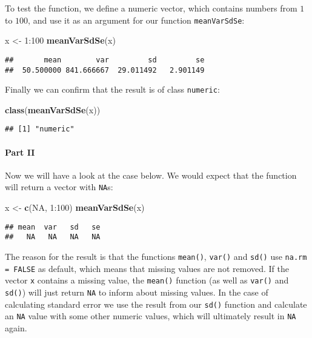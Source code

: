 \documentclass[11,]{article}
\newenvironment{Shaded}{\begin{snugshade}}{\end{snugshade}}
\newcommand{\KeywordTok}[1]{\textcolor[rgb]{0.13,0.29,0.53}{\textbf{{#1}}}}
\newcommand{\DecValTok}[1]{\textcolor[rgb]{0.00,0.00,0.81}{{#1}}}
\newcommand{\StringTok}[1]{\textcolor[rgb]{0.31,0.60,0.02}{{#1}}}
\newcommand{\OtherTok}[1]{\textcolor[rgb]{0.56,0.35,0.01}{{#1}}}
\newcommand{\NormalTok}[1]{{#1}}
\begin{document}
To test the function, we define a numeric vector, which contains numbers
from \(1\) to \(100\), and use it as an argument for our function
\texttt{meanVarSdSe}:

\begin{Shaded}
\begin{Highlighting}[]
\NormalTok{x <-}\StringTok{ }\DecValTok{1}\NormalTok{:}\DecValTok{100}
\KeywordTok{meanVarSdSe}\NormalTok{(x)}
\end{Highlighting}
\end{Shaded}

\begin{verbatim}
##       mean        var         sd         se 
##  50.500000 841.666667  29.011492   2.901149
\end{verbatim}

Finally we can confirm that the result is of class \texttt{numeric}:

\begin{Shaded}
\begin{Highlighting}[]
\KeywordTok{class}\NormalTok{(}\KeywordTok{meanVarSdSe}\NormalTok{(x))}
\end{Highlighting}
\end{Shaded}

\begin{verbatim}
## [1] "numeric"
\end{verbatim}

\paragraph{Part II}\label{part-ii}

Now we will have a look at the case below. We would expect that the
function will return a vector with \texttt{NA}s:

\begin{Shaded}
\begin{Highlighting}[]
\NormalTok{x <-}\StringTok{ }\KeywordTok{c}\NormalTok{(}\OtherTok{NA}\NormalTok{, }\DecValTok{1}\NormalTok{:}\DecValTok{100}\NormalTok{)}
\KeywordTok{meanVarSdSe}\NormalTok{(x)}
\end{Highlighting}
\end{Shaded}

\begin{verbatim}
## mean  var   sd   se 
##   NA   NA   NA   NA
\end{verbatim}

The reason for the result is that the functions \texttt{mean()},
\texttt{var()} and \texttt{sd()} use \texttt{na.rm = FALSE} as default,
which means that missing values are not removed. If the vector
\texttt{x} contains a missing value, the \texttt{mean()} function (as
well as \texttt{var()} and \texttt{sd()}) will just return \texttt{NA}
to inform about missing values. In the case of calculating standard
error we use the result from our \texttt{sd()} function and calculate an
\texttt{NA} value with some other numeric values, which will ultimately
result in \texttt{NA} again.
\end{document}
